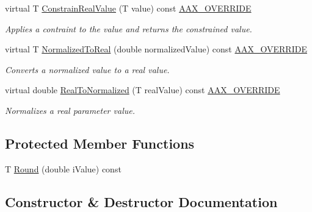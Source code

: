 \begin{DoxyCompactItemize}
virtual T \hyperlink{a00037_ac9d5c430c625bb3e9720d009a1b9d779}{Constrain\+Real\+Value} (T value) const \hyperlink{a00149_ac2f24a5172689ae684344abdcce55463}{A\+A\+X\+\_\+\+O\+V\+E\+R\+R\+I\+D\+E}
\begin{DoxyCompactList}\small\item\em Applies a contraint to the value and returns the constrained value. \end{DoxyCompactList}\item 
virtual T \hyperlink{a00037_aa95b3b0312bb861f20aa91888ba051bf}{Normalized\+To\+Real} (double normalized\+Value) const \hyperlink{a00149_ac2f24a5172689ae684344abdcce55463}{A\+A\+X\+\_\+\+O\+V\+E\+R\+R\+I\+D\+E}
\begin{DoxyCompactList}\small\item\em Converts a normalized value to a real value. \end{DoxyCompactList}\item 
virtual double \hyperlink{a00037_a5882df4a8f80ca2a88b512e87e7b36bc}{Real\+To\+Normalized} (T real\+Value) const \hyperlink{a00149_ac2f24a5172689ae684344abdcce55463}{A\+A\+X\+\_\+\+O\+V\+E\+R\+R\+I\+D\+E}
\begin{DoxyCompactList}\small\item\em Normalizes a real parameter value. \end{DoxyCompactList}\end{DoxyCompactItemize}
\subsection*{Protected Member Functions}
\begin{DoxyCompactItemize}
\item 
T \hyperlink{a00037_a26e2dfb5b66033fa7693ad88b5d81e86}{Round} (double i\+Value) const 
\end{DoxyCompactItemize}


\subsection{Constructor \& Destructor Documentation}
\hypertarget{a00037_a265a1e6a8f81a1ad8e1aad7ebfceb480}{}
